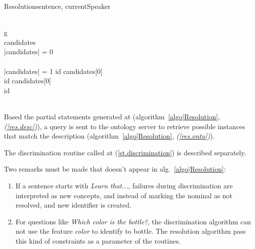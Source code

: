 \documentclass[twoside,a4paper,10pt]{report}
\begin{document}
\begin{pseudocode}[ruled]{Resolution}{sentence, currentSpeaker}
\label{algo|Resolution}

 \GETS {} \\

\FOREACH g \in {} \DO 
\BEGIN
    \GETS {} \\
   candidates \GETS {} \\
   
   \IF \left|{candidates}\right| = 0 \THEN
    \BEGIN
       \\
      \EXIT \\
    \END
   \ELSEIF \left|{candidates}\right| = 1 \THEN
      id \GETS candidates[0] \\

   \ELSE
      \BEGIN
	\IF {} \THEN
	  id \GETS candidates[0] \\
	\ELSE
	  id \GETS {} \\
      \END \\
\END
\end{pseudocode}

Based the partial statements generated at (algorithm~\ref{algo|Resolution},
\emph{(\ref{res.desc})}), a query is sent to the ontology server to retrieve
possible instances that match the description (algorithm~\ref{algo|Resolution},
\emph{(\ref{res.onto})}).

The discrimination routine called at (\ref{st.discrimination}) is described separately.

Two remarks must be made that doesn't appear in alg.~\ref{algo|Resolution}:
\begin{enumerate}
    \item If a sentence starts with {\it Learn that...}, failures during 
    discrimination are interpreted as new concepts, and instead of marking the 
    nominal as not resolved, and new identifier is created.
    \item For questions like {\it Which color is the bottle?}, the discrimination 
    algorithm can not use the feature {\it color} to identify to bottle. The 
    resolution algorithm pass this kind of constraints as a parameter of the 
     routines.
\end{enumerate}
\end{document}
